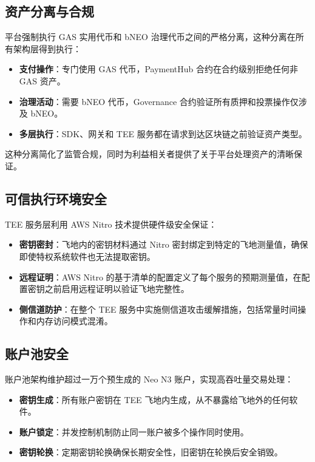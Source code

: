 \documentclass[11pt,a4paper]{article}
\begin{document}
\subsection{资产分离与合规}

平台强制执行 GAS 实用代币和 bNEO 治理代币之间的严格分离，这种分离在所有架构层得到执行：

\begin{itemize}
    \item \textbf{支付操作}：专门使用 GAS 代币，PaymentHub 合约在合约级别拒绝任何非 GAS 资产。
    \item \textbf{治理活动}：需要 bNEO 代币，Governance 合约验证所有质押和投票操作仅涉及 bNEO。
    \item \textbf{多层执行}：SDK、网关和 TEE 服务都在请求到达区块链之前验证资产类型。
\end{itemize}

这种分离简化了监管合规，同时为利益相关者提供了关于平台处理资产的清晰保证。

\subsection{可信执行环境安全}

TEE 服务层利用 AWS Nitro 技术提供硬件级安全保证：

\begin{itemize}
    \item \textbf{密钥密封}：飞地内的密钥材料通过 Nitro 密封绑定到特定的飞地测量值，确保即使特权系统软件也无法提取密钥。
    \item \textbf{远程证明}：AWS Nitro 的基于清单的配置定义了每个服务的预期测量值，在配置密钥之前启用远程证明以验证飞地完整性。
    \item \textbf{侧信道防护}：在整个 TEE 服务中实施侧信道攻击缓解措施，包括常量时间操作和内存访问模式混淆。
\end{itemize}

\subsection{账户池安全}

账户池架构维护超过一万个预生成的 Neo N3 账户，实现高吞吐量交易处理：

\begin{itemize}
    \item \textbf{密钥生成}：所有账户密钥在 TEE 飞地内生成，从不暴露给飞地外的任何软件。
    \item \textbf{账户锁定}：并发控制机制防止同一账户被多个操作同时使用。
    \item \textbf{密钥轮换}：定期密钥轮换确保长期安全性，旧密钥在轮换后安全销毁。
\end{itemize}
\end{document}
